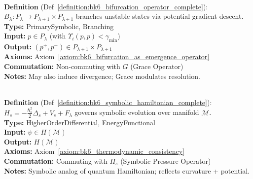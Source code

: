 \begin{description}[leftmargin=2.5cm, style=nextline]
\item[\textbf{Bifurcation Operator} \hfill \( B_{\lambda} \)] \leavevmode\\
\textbf{Definition} (Def~\ref{definition:bk6_bifurcation_operator_complete}): \( B_\lambda : P_\lambda \rightarrow P_{\lambda+1} \times P_{\lambda+1} \) branches unstable states via potential gradient descent.\\
\textbf{Type:} PrimarySymbolic, Branching\\
\textbf{Input:} \( p \in P_\lambda \) (with \( \Upsilon_i(p,p) < \gamma_{\min} \))\\
\textbf{Output:} \( (p^+, p^-) \in P_{\lambda+1} \times P_{\lambda+1} \)\\
\textbf{Axioms:} Axiom~\ref{axiom:bk6_bifurcation_as_emergence_operator}\\
\textbf{Commutation:} Non-commuting with \( G \) (Grace Operator)\\
\textbf{Notes:} May also induce divergence; Grace modulates resolution.

\item[\textbf{Symbolic Hamiltonian Operator} \hfill \( H_s \)] \leavevmode\\
\textbf{Definition} (Def~\ref{definition:bk6_symbolic_hamiltonian_complete}): \( H_s = - \frac{\hbar_s^2}{2} \Delta_s + V_s + F_\lambda \) governs symbolic evolution over manifold \( \mathcal{M} \).\\
\textbf{Type:} HigherOrderDifferential, EnergyFunctional\\
\textbf{Input:} \( \psi \in H(\mathcal{M}) \)\\
\textbf{Output:} \( H(\mathcal{M}) \)\\
\textbf{Axioms:} Axiom~\ref{axiom:bk6_thermodynamic_consistency}\\
\textbf{Commutation:} Commuting with \( \Pi_s \) (Symbolic Pressure Operator)\\
\textbf{Notes:} Symbolic analog of quantum Hamiltonian; reflects curvature + potential.


\end{description}
